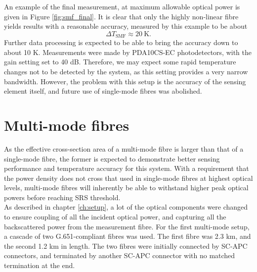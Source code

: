 \documentclass{standalone}
\begin{document}
An example of the final measurement, at maximum allowable optical power is given in Figure \ref{fig:smf_final}.
It is clear that only the highly non-linear fibre yields results with a reasonable accuracy, measured by this example to be about 
\begin{equation}
\varDelta T_\textrm{SMF} \approx \SI{20}{\kelvin} \textrm{.}
\end{equation}
Further data processing is expected to be able to bring the accuracy down to about 10 K. Measurements were made by PDA10CS-EC photodetectors, with the gain setting set to 40 dB. Therefore, we may expect some rapid temperature changes not to be detected by the system, as this setting provides a very narrow bandwidth. However, the problem with this setup is the accuracy of the sensing element itself, and future use of single-mode fibres was abolished.

\section{Multi-mode fibres}

As the effective cross-section area of a multi-mode fibre is larger than that of a single-mode fibre, the former is expected to demonstrate better sensing performance and temperature accuracy for this system. With a requirement that the power density does not cross that used in single-mode fibres at highest optical levels, multi-mode fibres will inherently be able to withstand higher peak optical powers before reaching SRS threshold. \\

As described in chapter \ref{ch:setup}, a lot of the optical components were changed to ensure coupling of all the incident optical power, and capturing all the backscattered power from the measurement fibre. For the first multi-mode setup, a cascade of two G.651-compliant fibres was used. The first fibre was 2.3 km, and the second 1.2 km in length. The two fibres were initially connected by SC-APC connectors, and terminated by another SC-APC connector with no matched termination at the end. \\
\end{document}

